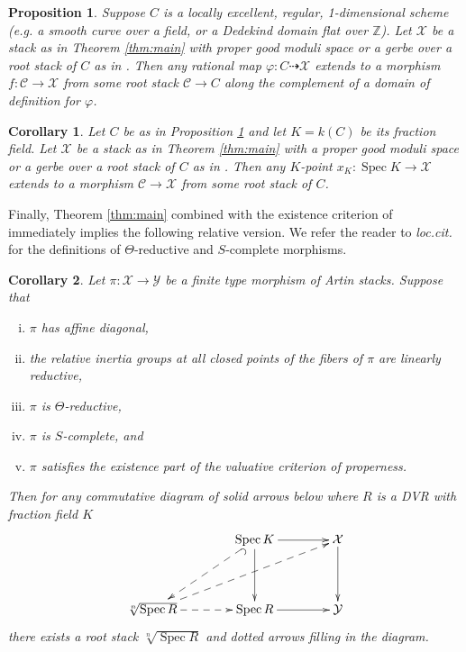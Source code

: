 \documentclass{amsart}
\newtheorem{corollary}[corollary]{Corollary}
\newtheorem{proposition}[proposition]{Proposition}
\theoremstyle{definition}
\newcommand{\bZ}{\mathbb{Z}}
\newcommand{\cX}{\mathcal{X}}
\newcommand{\cY}{\mathcal{Y}}
\newcommand{\cC}{\mathcal{C}}
\DeclareMathOperator{\Spec}{Spec}
\newcommand{\spec}{\operatorname{Spec}}
\begin{document}
\begin{proposition}\label{prop:main_global}
    Suppose $C$ is a locally excellent, regular, 1-dimensional scheme (e.g. a smooth curve over a field, or a Dedekind domain flat over $\bZ$). Let $\cX$ be a stack as in Theorem \ref{thm:main} with proper good moduli space or a gerbe over a root stack of $C$ as in . Then any rational map $\varphi : C \dashrightarrow \cX$ extends to a morphism $f\colon \cC \to \cX$ from some root stack $\cC \to C$ along the complement of a domain of definition for $\varphi$. 
\end{proposition}

\begin{corollary}\label{cor_global} Let $C$ be as in Proposition \ref{prop:main_global} and let $K = k(C)$ be its fraction field. Let $\cX$ be a stack as in Theorem \ref{thm:main} with a proper good moduli space or a gerbe over a root stack of $C$ as in . Then any $K$-point $x_K : \spec K \to \cX$ extends to a morphism $\cC \to \cX$ from some root stack of $C$.     
\end{corollary}


Finally, Theorem \ref{thm:main} combined with the existence criterion of \cite{AHLH} immediately implies the following relative version. We refer the reader to \emph{loc.cit.} for the definitions of $\Theta$-reductive and $S$-complete morphisms.  

\begin{corollary}
    Let $\pi : \cX \to \cY$ be a finite type morphism of Artin stacks. Suppose that \begin{enumerate}[(i)]
    \item $\pi$ has affine diagonal, 
    \item the relative inertia groups at all closed points of the fibers of $\pi$ are linearly reductive,
    \item $\pi$ is $\Theta$-reductive,
    \item $\pi$ is $S$-complete, and
    \item $\pi$ satisfies the existence part of the valuative criterion of properness. 
    \end{enumerate} 
    Then for any commutative diagram of solid arrows below where $R$ is a DVR with fraction field $K$
    \[
    \xymatrix@R=4em@C=4em{
        &\spec K \ar@{^{(}-->}[dl]\ar[d]\ar[r] & \cX\ar[d]\\
        \sqrt[n]{\Spec R} \ar@{-->}[r] \ar@{-->}[rru]&\spec R\ar[r] & \cY
    }
    \]
    there exists a root stack $\sqrt[n]{\spec R}$ and dotted arrows filling in the diagram.     
\end{corollary}
\end{document}
